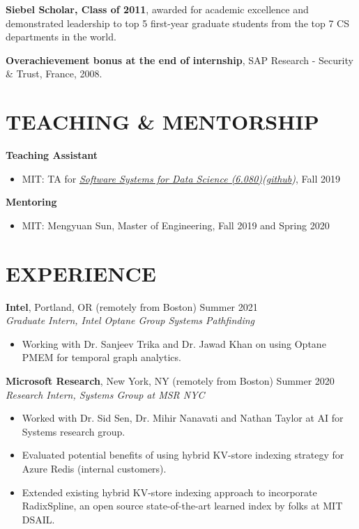 \documentclass[line,margin]{res}
\begin{document}
\begin{resume}
\textbf{Siebel Scholar, Class of 2011}, awarded for academic excellence and demonstrated leadership to top 5 first-year graduate students from the top 7 CS departments in the world.

\textbf{Overachievement bonus at the end of internship}, SAP Research - Security \& Trust, France, 2008.




\section{TEACHING \& MENTORSHIP}
  \textbf{Teaching Assistant} \\
  \begin{itemize}
    \item MIT: TA for {\sl \href{http://dsg.csail.mit.edu/6.S080/}{Software Systems for Data Science (6.080)}(\href{https://github.com/mitdbg/datascienceclass}{github})}, Fall 2019
  \end{itemize}

  \textbf{Mentoring} \\
  \begin{itemize}
    \item MIT: Mengyuan Sun, Master of Engineering, Fall 2019 and Spring 2020
  \end{itemize}

\section{EXPERIENCE}

  \textbf{Intel}, Portland, OR (remotely from Boston) \hfill Summer 2021 \\
  {\sl Graduate Intern, Intel Optane Group Systems Pathfinding}
  \begin{itemize}
  \item Working with Dr. Sanjeev Trika and Dr. Jawad Khan on using Optane PMEM for temporal graph analytics.
  \end{itemize}

  \textbf{Microsoft Research}, New York, NY (remotely from Boston) \hfill Summer 2020 \\
  {\sl Research Intern, Systems Group at MSR NYC}
  \begin{itemize}
  \item Worked with Dr. Sid Sen, Dr. Mihir Nanavati and Nathan Taylor at AI for Systems research group.
  \item Evaluated potential benefits of using hybrid KV-store indexing strategy for Azure Redis (internal customers).
  \item Extended existing hybrid KV-store indexing approach to incorporate RadixSpline, an open source state-of-the-art learned index by folks at MIT DSAIL.
  \end{itemize}


\end{resume}
\end{document}
